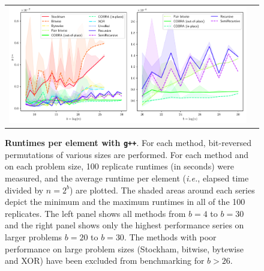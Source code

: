 ﻿\documentclass[10pt]{article}
\begin{document}
{\begin{figure}[ht!]
\centering
\begin{tabular}{cc}
  \includegraphics[width=6in]{results/clang++_run_times.pdf}
\end{tabular}
\caption{{\bf Runtimes per element with {\tt g++}}. For each method,
  bit-reversed permutations of various sizes are performed. For each
  method and on each problem size, 100 replicate runtimes (in seconds)
  were measured, and the average runtime per element (\emph{i.e.},
  elapsed time divided by $n = 2^b$) are plotted. The shaded areas
  around each series depict the minimum and the maximum runtimes in 
  all of the 100 replicates. The left panel shows all
  methods from $b=4$ to $b=30$ and the right panel shows only the
  highest performance series on larger problems $b=20$ to $b=30$. The
  methods with poor performance on large problem sizes (Stockham,
  bitwise, bytewise and XOR) have been excluded from benchmarking for
  $b>26$.
  \label{fig:clang++_runtimes}	
}
\end{figure}

}
\end{document}
